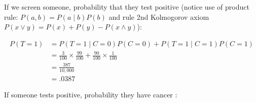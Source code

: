 \documentclass[11pt]{article}
\begin{document}
If we screen someone, probability that they test positive (notice use of product rule: \(P(a, b) = P(a \mid b) P(b)\) and rule 2nd Kolmogorov axiom \(P(x \lor y) = P(x) + P(y) - P(x \land y)\)):

\vspace{-.1in}
\begin{align*}
P(T=1) &= P(T=1 \mid C=0)P(C=0) + P(T=1 \mid C=1)P(C=1)\\
       &= \frac{3}{100} \times \frac{99}{100} + \frac{90}{100} \times \frac{1}{100}\\
       &= \frac{387}{10,000}\\
       &= .0387
\end{align*}

If someone tests positive, probability they have cancer :
\end{document}

